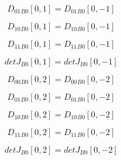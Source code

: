 \documentclass{article}
\begin{document}
\begin{dmath}{D_{01}{_{B0}}}[{0,1}] = {D_{01}{_{B0}}}[{0,-1}]\end{dmath}

\begin{dmath}{D_{10}{_{B0}}}[{0,1}] = {D_{10}{_{B0}}}[{0,-1}]\end{dmath}

\begin{dmath}{D_{11}{_{B0}}}[{0,1}] = {D_{11}{_{B0}}}[{0,-1}]\end{dmath}

\begin{dmath}{detJ{_{B0}}}[{0,1}] = {detJ{_{B0}}}[{0,-1}]\end{dmath}

\begin{dmath}{D_{00}{_{B0}}}[{0,2}] = {D_{00}{_{B0}}}[{0,-2}]\end{dmath}

\begin{dmath}{D_{01}{_{B0}}}[{0,2}] = {D_{01}{_{B0}}}[{0,-2}]\end{dmath}

\begin{dmath}{D_{10}{_{B0}}}[{0,2}] = {D_{10}{_{B0}}}[{0,-2}]\end{dmath}

\begin{dmath}{D_{11}{_{B0}}}[{0,2}] = {D_{11}{_{B0}}}[{0,-2}]\end{dmath}

\begin{dmath}{detJ{_{B0}}}[{0,2}] = {detJ{_{B0}}}[{0,-2}]\end{dmath}
\end{document}
